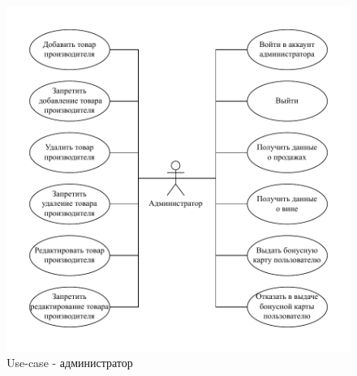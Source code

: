 \begin{figure}[H]
	\begin{center}
		\includegraphics[scale=0.8]{img/administrator.pdf}
	\end{center}
	\captionsetup{justification=centering}
	\caption{Use-case - администратор}
	\label{img:administrator}
\end{figure}